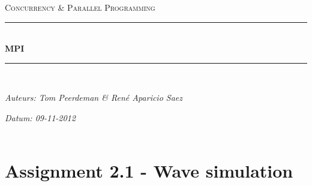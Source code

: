 \documentclass[a4paper]{article}
\newcommand{\HRule}{\rule{\linewidth}{0.5mm}}
\begin{document}
	\begin{titlepage}
	\begin{center}
		\textsc{\Large Concurrency \& Parallel Programming}\\[0.5cm]
		\HRule \\[0,4cm]
		\textsc{\huge \bfseries MPI}
		\HRule \\[8cm]
		\begin{minipage}{0.4\textwidth}
			\begin{flushleft}\large
				\emph{Auteurs: Tom Peerdeman \& Ren\'e Aparicio Saez}\\
			\end{flushleft}
		\end{minipage}
		\begin{minipage}{0.4\textwidth}
			\begin{flushright}\large
			\emph{Datum: 09-11-2012\\\hspace{1cm}}\\
			\end{flushright}
		\end{minipage}
	\end{center}
	\end{titlepage}

  \section{Assignment 2.1 - Wave simulation}
\end{document}
